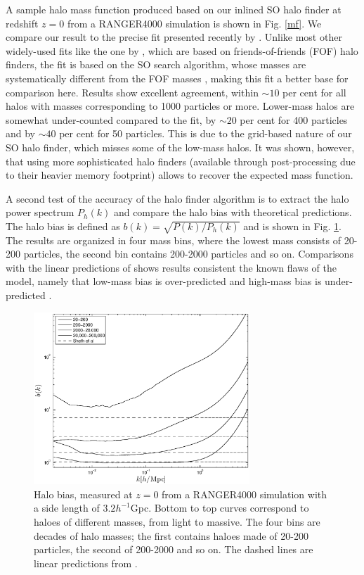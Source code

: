 A sample halo mass function produced based on our inlined SO halo finder 
at redshift $z=0$ from a RANGER4000 simulation is shown in Fig. \ref{mf}. We compare our result to the 
precise fit presented recently by \citet{2008ApJ...688..709T}. Unlike most
other widely-used fits like the one by \citet{2002MNRAS.329...61S}, which are based on friends-of-friends (FOF)
halo finders, the \citet{2008ApJ...688..709T} fit is based on the
SO search algorithm, whose masses are systematically different 
from the FOF masses \citep[e.g.][]{2007MNRAS.374....2R,2008ApJ...688..709T}, 
making this fit a better base for comparison here. Results show excellent
agreement, within $\sim10$ per cent for all halos with masses corresponding to
1000 particles or more. Lower-mass halos are somewhat under-counted compared
to the \citet{2008ApJ...688..709T} fit, by $\sim20$ per cent for 400 particles and 
by $\sim40$ per cent for 50 particles. This is due to the grid-based nature of our
SO halo finder, which misses some of the low-mass halos. It was shown, however, that using more sophisticated
halo finders (available through post-processing due to their heavier memory
footprint) allows to recover the expected mass function.

A second test of the accuracy of the halo finder algorithm is to extract the halo power spectrum $P_{h}(k)$ and compare the halo bias
with theoretical predictions. The halo bias is defined as $b(k) = \sqrt{P(k)/P_{h}(k)}$ and is shown in Fig. \ref{fig:halo}.
The results are organized in four mass bins, where the lowest mass consists of 20-200 particles, the second bin 
contains 200-2000 particles and so on. Comparisons with the linear predictions of \citet{2001MNRAS.323....1S} shows
results consistent the known flaws of the model, namely that low-mass bias is over-predicted and high-mass bias is under-predicted \citep{2010ApJ...724..878T}.

\begin{figure}%
  \begin{center}
    \includegraphics[width=3.2in]{graphs/bias.eps}
  \end{center}
  \caption{Halo bias, measured at $z=0$ from a RANGER4000 simulation with a side length of $3.2 h^{-1}$Gpc.
  Bottom to top curves correspond to haloes of different masses, from light to massive. The four bins are decades
  of halo masses; the first contains haloes made of 20-200 particles, the second of 200-2000 and so on.
  The dashed lines are linear predictions from \protect \citet{2001MNRAS.323....1S}.
    \label{fig:halo}}
\end{figure}


